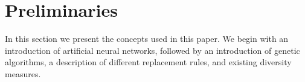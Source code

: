 \section{Preliminaries}
\label{sec:preliminaries}
In this section we present the concepts used in this paper.
We begin with an introduction of artificial neural networks, followed by an introduction of genetic algorithms, a description of different replacement rules, and existing diversity measures.








